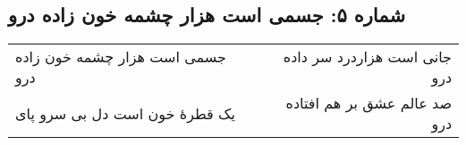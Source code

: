\begin{center}
\section*{شماره ۵: جسمی است هزار چشمه خون زاده درو}
\label{sec:005}
\begin{longtable}{l p{0.5cm} r}
جسمی است هزار چشمه خون زاده درو
&&
جانی است هزاردرد سر داده درو
\\
یک قطرهٔ خون است دل بی سرو پای
&&
صد عالم عشق بر هم افتاده درو
\\
\end{longtable}
\end{center}
